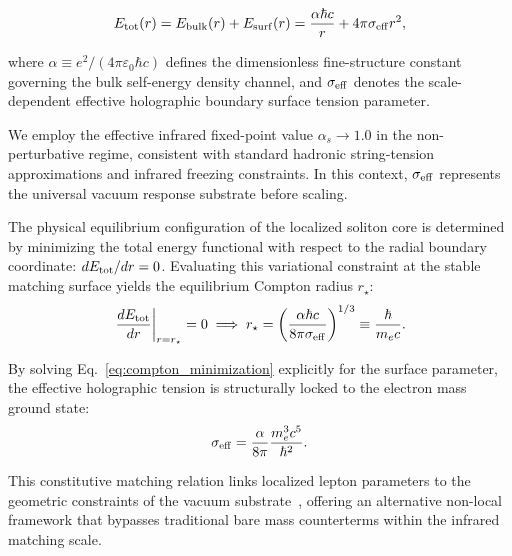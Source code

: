 \documentclass[
  reprint,
  aps,
  prd,
  twocolumn,
  superscriptaddress,
  nofootinbib,
  floatfix
]{revtex4-2}
\begin{document}
\begin{equation}
\label{eq:etot_functional}
E_{\rm tot}(r) = E_{\rm bulk}(r) + E_{\rm surf}(r) =
\frac{\alpha\hbar c}{r} + 4\pi\sigma_{\rm eff} r^2,
\end{equation}

where $\alpha \equiv e^2/(4\pi\varepsilon_0\hbar c)$ defines 
the dimensionless fine-structure constant governing the bulk 
self-energy density channel, and $\sigma_{\rm eff}$ denotes 
the scale-dependent effective holographic boundary surface 
tension parameter.

We employ the effective infrared fixed-point value 
$\alpha_s \to 1.0$ in the non-perturbative regime, 
consistent with standard hadronic string-tension 
approximations and infrared freezing constraints. 
In this context, $\sigma_{\rm eff}$ represents the 
universal vacuum response substrate before scaling.

The physical equilibrium configuration of the localized 
soliton core is determined by minimizing the total 
energy functional with respect to the radial boundary 
coordinate: $dE_{\rm tot}/dr = 0$. Evaluating this 
variational constraint at the stable matching surface 
yields the equilibrium Compton radius $r_\star$:
\begin{equation}
\label{eq:compton_minimization}
\left. \frac{dE_{\rm tot}}{dr} \right|_{r=r_\star} = 0 
\implies r_\star = \left( \frac{\alpha\hbar c}{8\pi\sigma_{\rm eff}} 
\right)^{1/3} \equiv \frac{\hbar}{m_e c}.
\end{equation}

By solving Eq.~\eqref{eq:compton_minimization} explicitly 
for the surface parameter, the effective holographic tension 
is structurally locked to the electron mass ground state:
\begin{equation}
\label{eq:sigma_eff_locked}
\sigma_{\rm eff} = \frac{\alpha}{8\pi} \frac{m_e^3 c^5}{\hbar^2}.
\end{equation}

This constitutive matching relation links localized lepton 
parameters to the geometric constraints of the vacuum 
substrate~\cite{Dirac1938}, offering an alternative non-local 
framework that bypasses traditional bare mass counterterms 
within the infrared matching scale.
\end{document}
